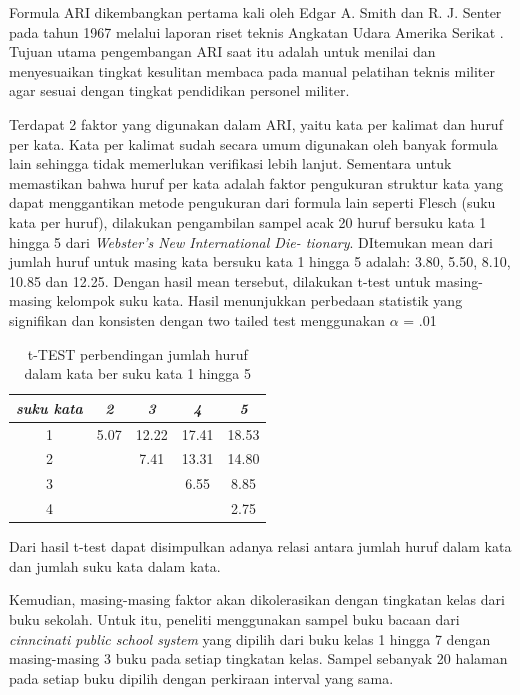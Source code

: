Formula ARI dikembangkan pertama kali oleh Edgar A. Smith dan R. J. Senter pada tahun 1967 melalui laporan riset teknis Angkatan Udara Amerika Serikat \cite{smith1967automated}. Tujuan utama pengembangan ARI saat itu adalah untuk menilai dan menyesuaikan tingkat kesulitan membaca pada manual pelatihan teknis militer agar sesuai dengan tingkat pendidikan personel militer.

Terdapat 2 faktor yang digunakan dalam ARI, yaitu kata per kalimat dan huruf per kata. Kata per kalimat sudah secara umum digunakan oleh banyak formula lain  sehingga tidak memerlukan verifikasi lebih lanjut. Sementara untuk memastikan bahwa huruf per kata adalah faktor pengukuran struktur kata yang dapat menggantikan metode pengukuran dari formula lain seperti Flesch (suku kata per huruf), dilakukan pengambilan sampel acak 20 huruf bersuku kata 1 hingga 5 dari \textit{Webster's New International Die-
tionary}. DItemukan mean dari jumlah huruf untuk masing kata bersuku kata 1 hingga 5 adalah: 3.80, 5.50, 8.10, 10.85 dan 12.25. Dengan hasil mean tersebut, dilakukan t-test untuk masing-masing kelompok suku kata. Hasil menunjukkan perbedaan statistik yang signifikan dan konsisten dengan two tailed test menggunakan $\alpha$ = .01  

\begin{table}[htbp]
    \centering
    \caption{t-TEST perbendingan jumlah huruf dalam kata ber suku kata 1 hingga 5}
    \begin{tabular}{ccccc}
        \textit{suku kata} & \textit{2} & \textit{3} & \textit{4} & \textit{5} \\
        \midrule
        1 & 5.07 & 12.22 & 17.41 & 18.53 \\
        \midrule
        2 &      & 7.41  & 13.31 & 14.80 \\
        \midrule
        3 &      &       & 6.55  & 8.85  \\
        \midrule
        4 &      &       &       & 2.75  \\
        \bottomrule
    \end{tabular}
\end{table}

Dari hasil t-test dapat disimpulkan adanya relasi antara jumlah huruf dalam kata dan jumlah suku kata dalam kata.

Kemudian, masing-masing faktor akan dikolerasikan dengan tingkatan kelas dari buku sekolah. Untuk itu, peneliti menggunakan sampel buku bacaan dari \textit{cinncinati public school system }yang dipilih dari buku kelas 1 hingga 7 dengan masing-masing 3 buku pada setiap tingkatan kelas. Sampel sebanyak 20 halaman pada setiap buku dipilih dengan perkiraan interval yang sama. 

